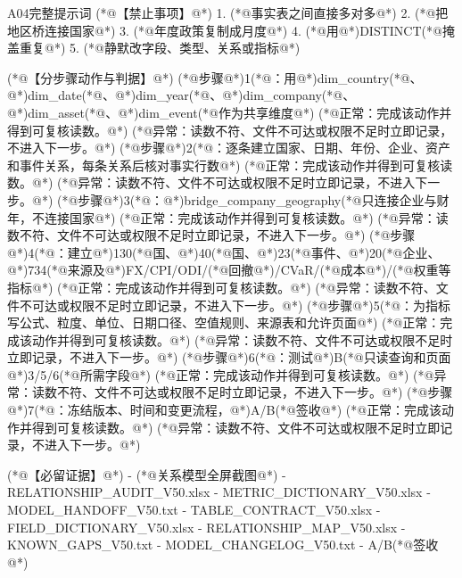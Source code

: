\documentclass[UTF8,openany,zihao=-4]{ctexbook}
\renewcommand{\_}{\textunderscore\allowbreak}
\begin{document}
\begin{PromptBox}{A04完整提示词}
(*@{\promptcjk 【禁止事项】}@*)
1. (*@{\promptcjk 事实表之间直接多对多}@*)
2. (*@{\promptcjk 把地区桥连接国家}@*)
3. (*@{\promptcjk 年度政策复制成月度}@*)
4. (*@{\promptcjk 用}@*)DISTINCT(*@{\promptcjk 掩盖重复}@*)
5. (*@{\promptcjk 静默改字段、类型、关系或指标}@*)

(*@{\promptcjk 【分步骤动作与判据】}@*)
(*@{\promptcjk 步骤}@*)1(*@{\promptcjk ：用}@*)dim_country(*@{\promptcjk 、}@*)dim_date(*@{\promptcjk 、}@*)dim_year(*@{\promptcjk 、}@*)dim_company(*@{\promptcjk 、}@*)dim_asset(*@{\promptcjk 、}@*)dim_event(*@{\promptcjk 作为共享维度}@*)
  (*@{\promptcjk 正常：完成该动作并得到可复核读数。}@*)
  (*@{\promptcjk 异常：读数不符、文件不可达或权限不足时立即记录，不进入下一步。}@*)
(*@{\promptcjk 步骤}@*)2(*@{\promptcjk ：逐条建立国家、日期、年份、企业、资产和事件关系，每条关系后核对事实行数}@*)
  (*@{\promptcjk 正常：完成该动作并得到可复核读数。}@*)
  (*@{\promptcjk 异常：读数不符、文件不可达或权限不足时立即记录，不进入下一步。}@*)
(*@{\promptcjk 步骤}@*)3(*@{\promptcjk ：}@*)bridge_company_geography(*@{\promptcjk 只连接企业与财年，不连接国家}@*)
  (*@{\promptcjk 正常：完成该动作并得到可复核读数。}@*)
  (*@{\promptcjk 异常：读数不符、文件不可达或权限不足时立即记录，不进入下一步。}@*)
(*@{\promptcjk 步骤}@*)4(*@{\promptcjk ：建立}@*)130(*@{\promptcjk 国、}@*)40(*@{\promptcjk 国、}@*)23(*@{\promptcjk 事件、}@*)20(*@{\promptcjk 企业、}@*)734(*@{\promptcjk 来源及}@*)FX/CPI/ODI/(*@{\promptcjk 回撤}@*)/CVaR/(*@{\promptcjk 成本}@*)/(*@{\promptcjk 权重等指标}@*)
  (*@{\promptcjk 正常：完成该动作并得到可复核读数。}@*)
  (*@{\promptcjk 异常：读数不符、文件不可达或权限不足时立即记录，不进入下一步。}@*)
(*@{\promptcjk 步骤}@*)5(*@{\promptcjk ：为指标写公式、粒度、单位、日期口径、空值规则、来源表和允许页面}@*)
  (*@{\promptcjk 正常：完成该动作并得到可复核读数。}@*)
  (*@{\promptcjk 异常：读数不符、文件不可达或权限不足时立即记录，不进入下一步。}@*)
(*@{\promptcjk 步骤}@*)6(*@{\promptcjk ：测试}@*)B(*@{\promptcjk 只读查询和页面}@*)3/5/6(*@{\promptcjk 所需字段}@*)
  (*@{\promptcjk 正常：完成该动作并得到可复核读数。}@*)
  (*@{\promptcjk 异常：读数不符、文件不可达或权限不足时立即记录，不进入下一步。}@*)
(*@{\promptcjk 步骤}@*)7(*@{\promptcjk ：冻结版本、时间和变更流程，}@*)A/B(*@{\promptcjk 签收}@*)
  (*@{\promptcjk 正常：完成该动作并得到可复核读数。}@*)
  (*@{\promptcjk 异常：读数不符、文件不可达或权限不足时立即记录，不进入下一步。}@*)

(*@{\promptcjk 【必留证据】}@*)
- (*@{\promptcjk 关系模型全屏截图}@*)
- RELATIONSHIP_AUDIT_V50.xlsx
- METRIC_DICTIONARY_V50.xlsx
- MODEL_HANDOFF_V50.txt
- TABLE_CONTRACT_V50.xlsx
- FIELD_DICTIONARY_V50.xlsx
- RELATIONSHIP_MAP_V50.xlsx
- KNOWN_GAPS_V50.txt
- MODEL_CHANGELOG_V50.txt
- A/B(*@{\promptcjk 签收}@*)


\end{PromptBox}
\end{document}
